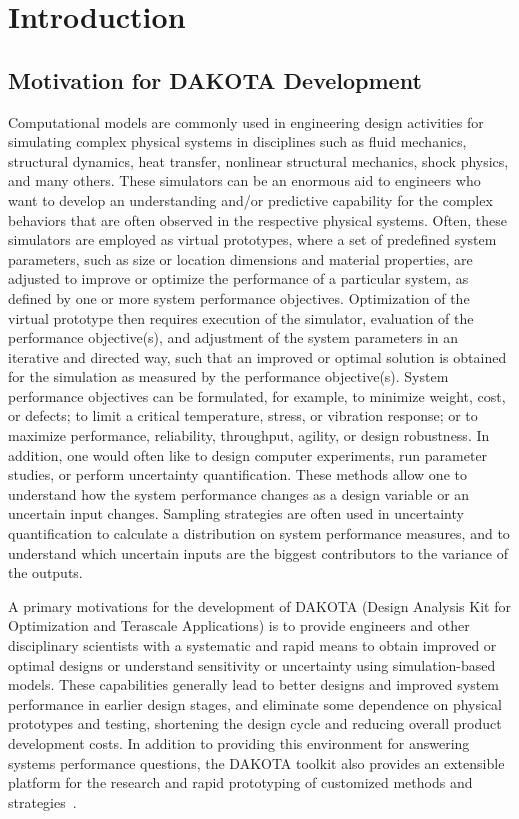 \chapter{Introduction}\label{introduction}

\section{Motivation for DAKOTA Development}\label{introduction:motivation}

Computational models are commonly used in engineering design
activities for simulating complex physical systems in disciplines such
as fluid mechanics, structural dynamics, heat transfer, nonlinear
structural mechanics, shock physics, and many others. These simulators
can be an enormous aid to engineers who want to develop an
understanding and/or predictive capability for the complex behaviors
that are often observed in the respective physical systems. Often,
these simulators are employed as virtual prototypes, where a set of
predefined system parameters, such as size or location dimensions and
material properties, are adjusted to improve or optimize the
performance of a particular system, as defined by one or more system
performance objectives. Optimization of the virtual prototype then
requires execution of the simulator, evaluation of the performance
objective(s), and adjustment of the system parameters in an iterative
and directed way, such that an improved or optimal solution is
obtained for the simulation as measured by the performance
objective(s). System performance objectives can be formulated, for
example, to minimize weight, cost, or defects; to limit a critical
temperature, stress, or vibration response; or to maximize
performance, reliability, throughput, agility, or design robustness.
In addition, one would often like to design computer experiments, run
parameter studies, or perform uncertainty quantification. These
methods allow one to understand how the system performance changes as
a design variable or an uncertain input changes.  Sampling strategies
are often used in uncertainty quantification to calculate a
distribution on system performance measures, and to understand which
uncertain inputs are the biggest contributors to the variance of the
outputs.

A primary motivations for the development of DAKOTA (Design Analysis
Kit for Optimization and Terascale Applications) is to provide
engineers and other disciplinary scientists with a systematic and
rapid means to obtain improved or optimal designs or understand
sensitivity or uncertainty using simulation-based models. These
capabilities generally lead to better designs and improved system
performance in earlier design stages, and eliminate some dependence on
physical prototypes and testing, shortening the design cycle and
reducing overall product development costs. In addition to providing
this environment for answering systems performance questions, the
DAKOTA toolkit also provides an extensible platform for the research
and rapid prototyping of customized methods and
strategies~\cite{Eld98b}.


